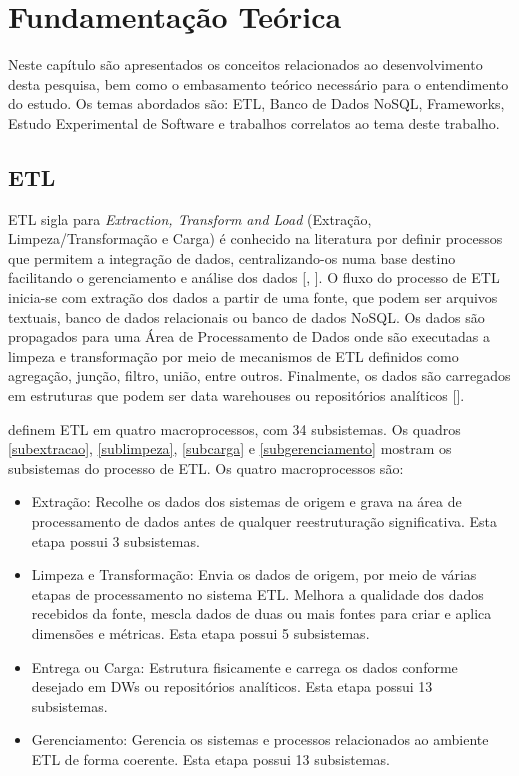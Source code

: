 \chapter{Fundamentação Teórica}

Neste capítulo são apresentados os conceitos relacionados ao desenvolvimento desta pesquisa, bem como o embasamento teórico necessário para o entendimento do estudo. Os temas abordados são: ETL, Banco de Dados NoSQL, Frameworks, Estudo Experimental de Software e trabalhos correlatos ao tema deste trabalho.


\clearpage

\section{ETL}

ETL sigla para \textit{Extraction, Transform and Load} (Extração, Limpeza/Transformação e Carga) é conhecido na literatura por definir processos que permitem a integração de dados, centralizando-os numa base destino facilitando o gerenciamento e análise dos dados [\cite{kimball:2004}, \cite{rud:2009}]. O fluxo do processo de ETL inicia-se com extração dos dados a partir de uma fonte, que podem ser arquivos textuais, banco de dados relacionais ou banco de dados NoSQL. Os dados são propagados para uma Área de Processamento de Dados onde são executadas a limpeza e transformação por meio de mecanismos de ETL definidos como agregação, junção, filtro, união, entre outros. Finalmente, os dados são carregados em estruturas que podem ser data warehouses ou repositórios analíticos [\cite{silva:2016}]. 

\cite{kimball:2004} definem ETL em quatro macroprocessos, com 34 subsistemas. Os quadros \ref{subextracao}, \ref{sublimpeza}, \ref{subcarga} e \ref{subgerenciamento} mostram os subsistemas do processo de ETL. Os quatro macroprocessos são:

\begin{itemize}
	\item Extração: Recolhe os dados dos sistemas de origem e grava na área de processamento de dados antes de qualquer reestruturação significativa. Esta etapa possui 3 subsistemas.
	
	\item Limpeza e Transformação: Envia os dados de origem, por meio de várias etapas de processamento no sistema ETL. Melhora a qualidade dos dados recebidos da fonte, mescla dados de duas ou mais fontes para criar e aplica dimensões e métricas. Esta etapa possui 5 subsistemas.
	
	\item Entrega ou Carga: Estrutura fisicamente e carrega os dados conforme desejado em DWs ou repositórios analíticos. Esta etapa possui 13 subsistemas.
	
	\item Gerenciamento: Gerencia os sistemas e processos relacionados ao ambiente ETL de forma coerente. Esta etapa possui 13 subsistemas.
\end{itemize}
\clearpage

